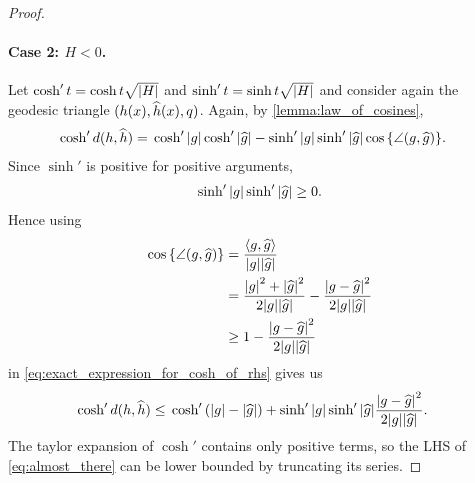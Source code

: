\documentclass[english, a4paper, 12pt]{article}
\newcommand\bodgeip[2]{\langle #1, #2 \rangle} %
\begin{document}
\begin{proof}
	\paragraph{Case 2: $H < 0$.}
	Let $\cosh'{t} = \cosh{t \sqrt{\abs{H}}}$ and $\sinh'{t} = \sinh{t \sqrt{\abs{H}}}$ and consider again the geodesic triangle $(h(x), \widehat{h}(x), q)$.
	Again, by \cref{lemma:law_of_cosines},
	\begin{align}
		\cosh'{d(h, \mathhat{h})} ={}&
		\cosh'{\abs{g}} \cosh'{\abs{\mathhat{g}}} - \sinh'{\abs{g}} \sinh'{\abs{\mathhat{g}}} \cos{\left\{ \angle(g, \mathhat{g}) \right\}}.%
		\label{eq:exact_expression_for_cosh_of_rhs}
	\end{align}
	Since $\sinh'{}$ is positive for positive arguments,
	\begin{align}
		\sinh'{\abs{g}} \sinh'{\abs{\widehat{g}}} \geq 0.
	\end{align}
	Hence using
	\begin{align}
		\cos{\left\{ \angle(g, \mathhat{g}) \right\}} ={}& \frac{\bodgeip{g}{\mathhat{g}}}{\abs{g} \abs{\mathhat{g}}}\\
		={}& \frac{\abs{g}^2 + \abs{\mathhat{g}}^2}{2 \abs{g} \abs{\mathhat{g}}} - \frac{\abs{g - \mathhat{g}}^2}{2 \abs{g} \abs{\mathhat{g}}}\\
		\geq{}& 1 - \frac{\abs{g - \mathhat{g}}^2}{2 \abs{g} \abs{\mathhat{g}}}
	\end{align}
	in \cref{eq:exact_expression_for_cosh_of_rhs} gives us
	\begin{align}
		\cosh'{d(h, \mathhat{h})} \leq{}& \cosh'{(\abs{g} - \abs{\mathhat{g}})} + \sinh'{\abs{g}} \sinh'{\abs{\mathhat{g}}} \frac{\abs{g - \mathhat{g}}^2}{2 \abs{g} \abs{\mathhat{g}}}.%
		\label{eq:almost_there}
	\end{align}
	The taylor expansion of $\cosh'{}$ contains only positive terms, so the LHS of \cref{eq:almost_there} can be lower bounded by truncating its series.

\end{proof}
\end{document}

